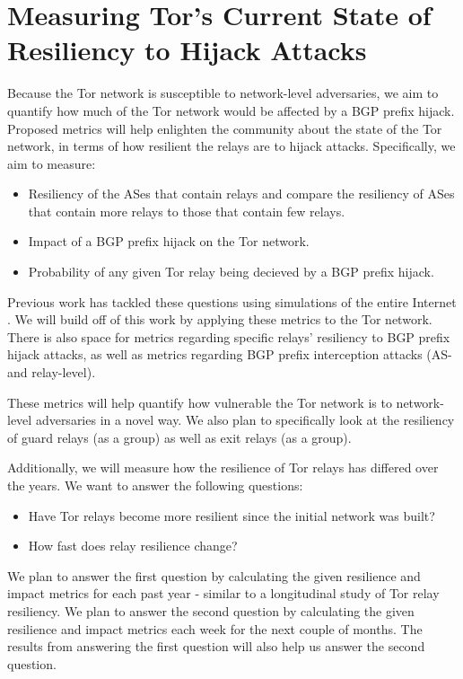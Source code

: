 \section{Measuring Tor's Current State of \\Resiliency to Hijack Attacks}

Because the Tor network is susceptible to network-level adversaries, we aim to quantify how much of the Tor network would be affected by a BGP prefix hijack.  Proposed metrics will help enlighten the community about the state of the Tor network, in terms of how resilient the relays are to hijack attacks.  Specifically, we aim to measure:

\begin{itemize}
\item Resiliency of the ASes that contain relays and compare the resiliency of ASes that contain more relays to those that contain few relays.
\item Impact of a BGP prefix hijack on the Tor network.
\item Probability of any given Tor relay being decieved by a BGP prefix hijack.
\end{itemize}

Previous work has tackled these questions using simulations of the entire Internet \cite{lad2007understanding}.  We will build off of this work by applying these metrics to the Tor network.  There is also space for metrics regarding specific relays' resiliency to BGP prefix hijack attacks, as well as metrics regarding BGP prefix interception attacks (AS- and relay-level).  

These metrics will help quantify how vulnerable the Tor network is to network-level adversaries in a novel way.  We also plan to specifically look at the resiliency of guard relays (as a group) as well as exit relays (as a group). 

Additionally, we will measure how the resilience of Tor relays has differed over the years.  We want to answer the following questions:

\begin{itemize}
\item Have Tor relays become more resilient since the initial network was built?
\item How fast does relay resilience change? 
\end{itemize}

We plan to answer the first question by calculating the given resilience and impact metrics for each past year - similar to a longitudinal study of Tor relay resiliency.  We plan to answer the second question by calculating the given resilience and impact metrics each week for the next couple of months.  The results from answering the first question will also help us answer the second question.

